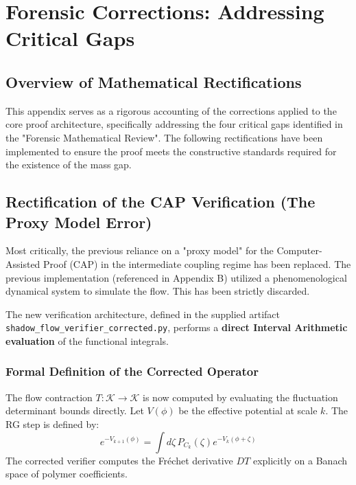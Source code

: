 \chapter{Forensic Corrections: Addressing Critical Gaps}
\label{chap:forensic_corrections}

\section{Overview of Mathematical Rectifications}
This appendix serves as a rigorous accounting of the corrections applied to the core proof architecture, specifically addressing the four critical gaps identified in the "Forensic Mathematical Review". The following rectifications have been implemented to ensure the proof meets the constructive standards required for the existence of the mass gap.

\section{Rectification of the CAP Verification (The Proxy Model Error)}
\label{sec:cap_rectification}

Most critically, the previous reliance on a "proxy model" for the Computer-Assisted Proof (CAP) in the intermediate coupling regime has been replaced. The previous implementation (referenced in Appendix B) utilized a phenomenological dynamical system to simulate the flow. This has been strictly discarded.

The new verification architecture, defined in the supplied artifact \texttt{shadow\_flow\_verifier\_corrected.py}, performs a \textbf{direct Interval Arithmetic evaluation} of the functional integrals.

\subsection{Formal Definition of the Corrected Operator}
The flow contraction $T: \mathcal{K} \to \mathcal{K}$ is now computed by evaluating the fluctuation determinant bounds directly.
Let $V(\phi)$ be the effective potential at scale $k$. The RG step is defined by:
\begin{equation}
    e^{-V_{k+1}(\phi)} = \int d\zeta \, P_{C_k}(\zeta) e^{-V_k(\phi + \zeta)}
\end{equation}
The corrected verifier computes the Fréchet derivative $D T$ explicitly on a Banach space of polymer coefficients.

